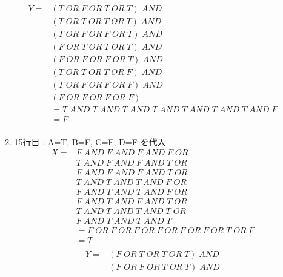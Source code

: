 \documentclass[dvipdfmx,10pt, a4j]{jarticle}
\theoremstyle{definition}
\begin{document}
\begin{enumerate}[i)]
\begin{enumerate}[1)]
\begin{align*}
            \end{align*}
            \begin{align*}
                Y = & (T\; OR\; F\; OR\; T\; OR\; T) \; AND\\
                & (T\; OR\; T\; OR\; T\; OR\; T)\; AND\\
                & (T\; OR\; F\; OR\; F\; OR\; T)\; AND\\
                & (F\; OR\; T\; OR\; T\; OR\; T)\; AND\\
                & (F\; OR\; F\; OR\; F\; OR\; T)\; AND\\
                & (T\; OR\; T\; OR\; T\; OR\; F)\; AND\\
                & (T\; OR\; F\; OR\; F\; OR\; F)\; AND\\
                & (F\; OR\; F\; OR\; F\; OR\; F)\\
                &= T\; AND\; T\; AND\; T\; AND\; T\; AND\; T\; AND\; T\; AND\; T\; AND\; F\\
                &= F\\
            \end{align*}
            \item 15行目 : A=T, B=F, C=F, D=F を代入\\
            \begin{align*}
                X = &F\; AND\; F\; AND\; F\; AND\; F\; OR\\
                &T\; AND\; F\; AND\; F\; AND\; T\; OR\\
                &F\; AND\; F\; AND\; F\; AND\; T\; OR\\
                &T\; AND\; T\; AND\; T\; AND\; F\; OR\\
                &F\; AND\; T\; AND\; T\; AND\; F\; OR\\
                &F\; AND\; T\; AND\; F\; AND\; T\; OR\\
                &T\; AND\; T\; AND\; T\; AND\; T\; OR\\
                &F\; AND\; T\; AND\; T\; AND\; T\\
                &= F\; OR\; F\; OR\; F\; OR\; F\; OR\; F\; OR\; F\; OR\; T\; OR\; F\\
                &= T\\
            \end{align*}
            \begin{align*}
                Y = & (F\; OR\; T\; OR\; T\; OR\; T) \; AND\\
                & (F\; OR\; F\; OR\; T\; OR\; T)\; AND\\

\end{align*}
\end{enumerate}
\end{enumerate}
\end{document}
